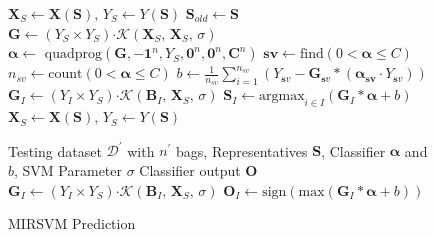 \begin{figure}[tpb]
\begin{algorithm}[H]
\begin{algorithmic}[1]
\EndFor
\State $\bm X_S \leftarrow \bm X(\bm S),\,Y_S \leftarrow Y(\bm S)$ 
\State $\bm S_{old} \leftarrow \bm S$
\State $\bm G \leftarrow (Y_S \times Y_S) \bm \cdot \mathcal{K}\left( \bm X_S,\,\bm X_S,\,\sigma\right)$ 
\State $\bm \alpha \leftarrow \text{ quadprog}\left(\bm G, \bm{-1}^n, Y_S, \bm 0^n, \bm 0^n, \bm C^n\right)$ 
\State $\bm{sv} \leftarrow \text{find}\left(0 < \bm \alpha \leq C \right)$ 
\State $n_{sv} \leftarrow \text{count}\left(0 < \bm \alpha \leq C \right)$ 
\State $b \leftarrow \frac{1}{n_{sv}}\sum_{i=1}^{n_{sv}} \left(Y_{\bm sv} - \bm G_{\bm sv}*\left(\bm{\alpha_{\bm sv}} \cdot Y_{\bm sv}\right)\right)$ 
\State $\bm G_I \leftarrow (Y_I \times Y_S) \bm \cdot \mathcal{K}\left( \bm B_I,\,\bm X_S,\,\sigma\right)$
\State $\bm S_I \leftarrow \text{argmax}_{i \in I}\left(\bm G_I*\bm{\alpha} + b \right)$ \tab\tab[0.62cm]
\EndFor
\State $\bm X_S \leftarrow \bm X(\bm S),\,Y_S \leftarrow Y(\bm S)$ 
\EndWhile 
\end{algorithmic} 
\end{algorithm}
\begin{algorithm}[H]
\caption{MIRSVM Prediction}
\label{alg:mirsvmtest} 
\begin{algorithmic}[1]
\renewcommand{\algorithmicrequire}{\textbf{Input:}}
\renewcommand{\algorithmicensure}{\textbf{Output:}}
\Require Testing dataset $\mathcal{D^\prime}$ with $n^\prime$ bags, Representatives $\bm S$, Classifier $\bm \alpha$ and $b$, SVM Parameter $\sigma$
\Ensure Classifier output $\bm O$
\State $\bm G_I \leftarrow (Y_I \times Y_S) \bm \cdot \mathcal{K}\left( \bm B_I,\,\bm X_S,\,\sigma\right)$
\State $\bm O_I \leftarrow \text{sign}(\text{max}\left(\bm G_I*\bm{\alpha} + b \right))$
\EndFor 
\end{algorithmic} 
\end{algorithm}
\end{figure}


